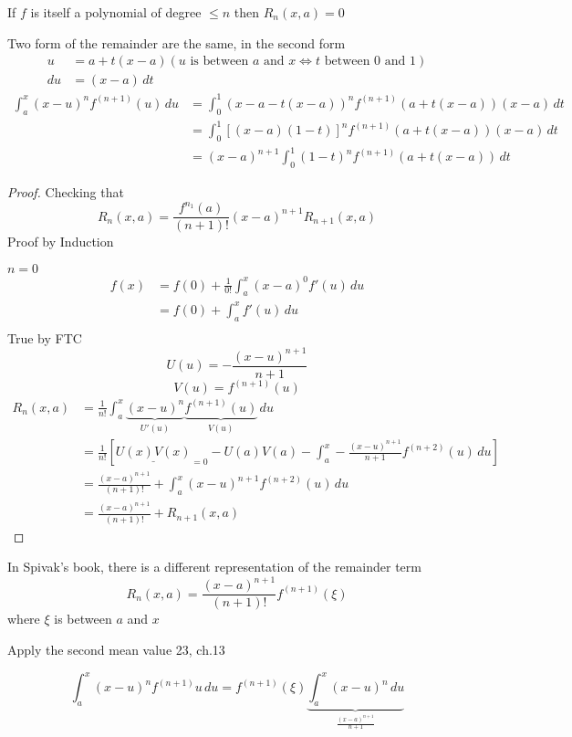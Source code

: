 If $f$ is itself a polynomial of degree $\le n$ then $R_n(x, a) = 0$

Two form of the remainder are the same, in the second form 
\begin{align*}
  u &= a + t(x-a) (u\text{ is between } a \text{ and } x \iff t \text{ between 0 and 1})\\ 
  du &= (x-a)\, dt
\end{align*}
\begin{align*}
  \int_a^x(x-u)^nf^{(n+1)}(u)\, du &= \int_0^1(x-a -t(x-a))^nf^{(n+1)}(a + t(x-a))(x-a)\, dt \\ 
  &= \int_0^1\left[(x-a)(1-t)\right]^nf^{(n+1)}(a + t(x-a))(x-a)\, dt \\
  &= (x-a)^{n+1} \int_0^1(1-t)^nf^{(n+1)}(a + t(x-a))\, dt
\end{align*}

\begin{proof}
  Checking that 
  \[R_n(x, a) = \frac{f^{n_1}(a)}{(n+1)!}(x-a)^{n+1} R_{n+1}(x, a)\]
  Proof by Induction

  $n = 0$
  \begin{align*}
    f(x) &= f(0) + \frac{1}{0!}\int_a^x(x-a)^0f'(u)\, du\\
    &= f(0) + \int_a^x f'(u) \, du\\
  \end{align*}
  True by FTC
  \[U(u) = -\frac{(x-u)^{n+1}}{n+1}\]
  \[V(u) = f^{(n+1)}(u)\]
  \begin{align*}
    R_n(x, a) &= \frac{1}{n!}\int_a^x\underbrace{(x-u)^n}_{U'(u)}\underbrace{f^{(n+1)}(u)}_{V(u)}\, du\\
    &= \frac{1}{n!}\left[\underline{U(x)V(x)}_{=0}-U(a)V(a) -\int_a^x-\frac{(x-u)^{n+1}}{n+1}f^{(n+2)}(u)\, du\right] \\
    &= \frac{(x-a)^{n+1}}{(n+1)!} + \int_a^x (x-u)^{n+1}f^{(n+2)}(u)\, du \\
    &=  \frac{(x-a)^{n+1}}{(n+1)!} + R_{n+1}(x, a) 
  \end{align*}
\end{proof}

In Spivak's book, there is a different representation of the remainder term
\[R_n(x, a) = \frac{(x-a)^{n+1}}{(n+1)!}f^{(n+1)}(\xi)\]
where $\xi$ is between $a$ and $x$

Apply the second mean value 23, ch.13

\[\int_a^x (x-u)^nf^{(n+1)}u\, du = f^{(n+1)}(\xi) \underbrace{\int_a^x (x-u)^n \, du}_{\frac{(x-a)^{n+1}}{n+1}}\]